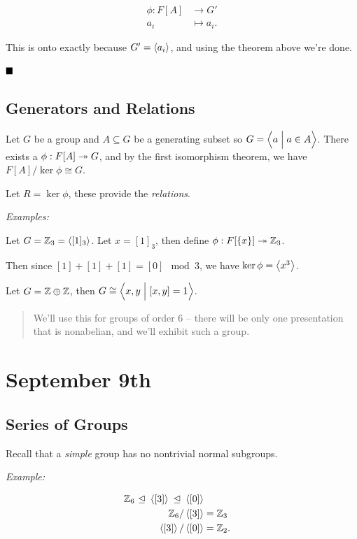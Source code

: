 \begin{align*}
\phi: F[A] &\to G' \\
a_i &\mapsto a_i
.\end{align*}

This is onto exactly because \(G' = \left\langle{a_i}\right\rangle\), and using the
theorem above we're done.

\(\qed\)

\hypertarget{generators-and-relations}{%
\subsection{Generators and Relations}\label{generators-and-relations}}

Let \(G\) be a group and \(A \subseteq G\) be a generating subset so
\(G = \left\langle{a \mathrel{\Big|}a\in A}\right\rangle\). There exists a
\(\phi: F[A] \twoheadrightarrow G\), and by the first isomorphism theorem, we
have \(F[A] / \ker \phi \cong G\).

Let \(R = \ker \phi\), these provide the \emph{relations}.

\emph{Examples:}

Let \(G = {\mathbb{Z}}_3 = \left\langle{[1]_3}\right\rangle\). Let \(x = [1]_3\), then define
\(\phi: F[\left\{{x}\right\}] \twoheadrightarrow {\mathbb{Z}}_3\).

Then since \([1] + [1] + [1] = [0] \mod 3\), we have
\(\ker \phi = \left\langle{x^3}\right\rangle\).

Let \(G = {\mathbb{Z}} \oplus {\mathbb{Z}}\), then
\(G \cong \left\langle{x,y \mathrel{\Big|}[x,y] = 1}\right\rangle\).

\begin{quote}
We'll use this for groups of order 6 -- there will be only one
presentation that is nonabelian, and we'll exhibit such a group.
\end{quote}

\hypertarget{september-9th}{%
\section{September 9th}\label{september-9th}}

\hypertarget{series-of-groups}{%
\subsection{Series of Groups}\label{series-of-groups}}

Recall that a \emph{simple} group has no nontrivial normal subgroups.

\emph{Example:}

\begin{align*}
{\mathbb{Z}}_6 {~\trianglelefteq~} \left\langle{[3]}\right\rangle {~\trianglelefteq~} \left\langle{[0]}\right\rangle \\
{\mathbb{Z}}_6 / \left\langle{[3]}\right\rangle &= {\mathbb{Z}}_3 \\
\left\langle{[3]}\right\rangle / \left\langle{[0]}\right\rangle &= {\mathbb{Z}}_2
.\end{align*}

